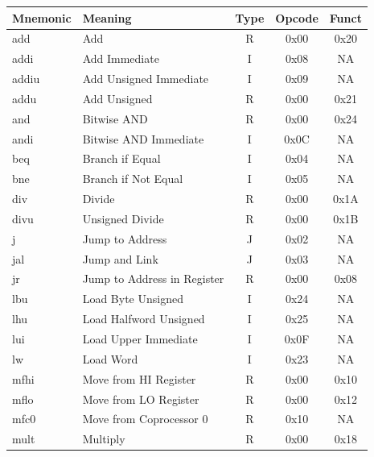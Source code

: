\noindent
\begin{tabular}{llccc}
Mnemonic & Meaning                                  & Type & Opcode & Funct \\\hline
add	     & Add	                                    & R	   & 0x00   & 0x20 \\
addi     & Add Immediate	                        & I    & 0x08   & NA \\
addiu    & Add Unsigned Immediate	                & I    & 0x09   & NA \\
addu     & Add Unsigned	                            & R    & 0x00   & 0x21 \\
and      & Bitwise AND	                            & R    & 0x00   & 0x24 \\
andi     & Bitwise AND Immediate	                & I    & 0x0C   & NA \\
beq      & Branch if Equal	                        & I    & 0x04   & NA \\
bne      & Branch if Not Equal	                    & I    & 0x05   & NA \\
div      & Divide	                                & R    & 0x00   & 0x1A \\
divu     & Unsigned Divide	                        & R    & 0x00   & 0x1B \\
j        & Jump to Address	                        & J    & 0x02   & NA \\
jal      & Jump and Link     	                    & J    & 0x03   & NA \\
jr       & Jump to Address in Register	            & R    & 0x00   & 0x08 \\
lbu      & Load Byte Unsigned	                    & I    & 0x24   & NA \\
lhu      & Load Halfword Unsigned	                & I    & 0x25   & NA \\
lui      & Load Upper Immediate	                    & I    & 0x0F   & NA \\
lw       & Load Word	                            & I    & 0x23   & NA \\
mfhi     & Move from HI Register	                & R    & 0x00   & 0x10 \\
mflo     & Move from LO Register	                & R    & 0x00   & 0x12 \\
mfc0     & Move from Coprocessor 0 	                & R    & 0x10   & NA \\
mult     & Multiply	                                & R    & 0x00   & 0x18 \\

\end{tabular}
